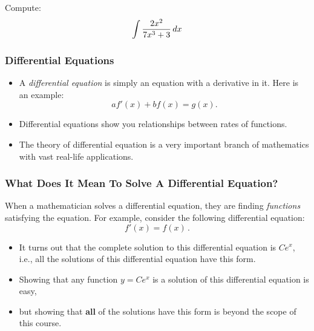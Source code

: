 \documentclass[10pt,t,handout,ignorenonframetext,aspectratio=169]{beamer}
\begin{document}
\begin{frame}
  \vs

  \begin{question}
    Compute:
    \[
      \int \frac{2x^2}{7x^3 + 3} \mathop{}\!d x
    \]
  \end{question}

\end{frame}



\begin{frame}
  \frametitle{Differential Equations}
  \begin{itemize}
  \item A \textit{differential equation} is
    simply an equation with a derivative in it. Here is an example:
    \[
      a f'(x)+ b f(x) = g(x).
    \]
  \item Differential equations show you relationships between rates of
    functions.
  \item The theory of differential equation is a very important
    branch of mathematics with vast real-life applications.
  \end{itemize}

\end{frame}

\begin{frame}
  \frametitle{What Does It Mean To Solve A Differential Equation?}
  When a mathematician solves a differential equation, they are finding
  \textit{functions} satisfying the equation. For example, consider the
  following differential equation:
  \[
    f'(x) = f(x) \,.
  \]

  \begin{itemize}
  \item It turns out that the complete solution to this differential equation
    is $Ce^x$, i.e., all the solutions of this differential equation have
    this form.
  \item Showing that any function $y=Ce^x$ is a solution of this differential
    equation is easy,
  \item but showing that \textbf{all} of the solutions have
    this form is beyond the scope of this course.
  \end{itemize}

\end{frame}
\end{document}

